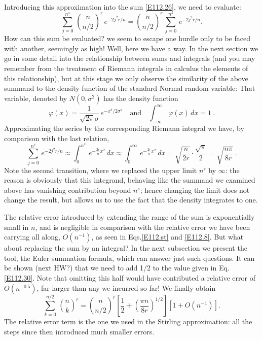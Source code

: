 \documentclass[11pt]{article}
\newcommand{\lp}{\left(}
\newcommand{\rp}{\right)}
\begin{document}
Introducing this approximation into the sum \eqref{E112.26}, we need to
evaluate:
\begin{equation}\label{E111.31}
\sum_{j=0}^{n^s} \,\binom{n}{n/2}^r \,e^{-2 j^2 r/n} =
\binom{n}{n/2}^r \,\sum_{j=0}^{n^s} \,e^{-2 j^2 r/n} . 
\end{equation}
How can this sum be evaluated?  we seem to escape one hurdle only to be
faced with another, seemingly as high!  Well, here we have a way.  In the
next section we go in some detail into the relationship between sums and
integrals (and you may remember from the treatment of Riemann integrals in
calculus the elements of this relationship), but at this stage we only
observe the similarity of the above summand to the density function of the
standard Normal random variable:
That variable, denoted by $N(0, \sigma^2 )$ 
has the density function
$$
\varphi (x) = \frac{1}{\sqrt{2\pi} \sigma} \,e^{-x^2 / 2 \sigma^2} \quad
\mbox{and} \quad \int_{-\infty}^\infty \,\varphi (x) \,dx =1 \ .
$$
Approximating the series by the corresponding Riemann integral we have, by
comparison with the last relation,
\begin{equation}\label{E112.30}
\sum_{j=0}^{n^s} \,e^{-2 j^2 r/n} \approx \int_0^{n^s} \,e^{-\frac{2r}{n}
x^2}\,dx \approx \int_0^\infty \,e^{-\frac{2r}{n} x^2}\,dx =
\sqrt{\frac{n}{2r}} \cdot \frac{\sqrt{\pi}}{2} = \sqrt{\frac{n\pi}{8r}} \ .
\end{equation}
Note the second transition, where we replaced the upper limit $n^s$ by
$\infty$:  the reason is obviously that this integrand, behaving like the
summand we examined above has vanishing contribution beyond $n^s$; hence
changing the limit does not change the result, but allows us to use the
fact that the density integrates to one.

The relative error introduced by extending the range of the sum
is exponentially small in $n$,
and is negligible in comparison with the relative error
we have been carrying all along, $O(n^{-1})$, as seen in
Eqs.\;\eqref{E112.st} and \eqref{E112.8}.  But what about replacing the sum
by an integral?  In the next subsection we present the tool, the
Euler summation formula, which can answer just such questions.
It can be shown (next HW?)
that we need to add 1/2 to the value given in Eq.\;\eqref{E112.30}.  Note
that omitting this half would have contributed a relative error of
$O(n^{-0.5})$, far larger than any we incurred so far!
We finally obtain
\begin{equation}\label{E112.32}
\sum_{k=0}^{n/2} \,\binom{n}{k}^r = \binom{n}{n/2}^r
\left[\frac1{2} + \lp \frac{\pi n}{8r} \rp^{1/2} \right]
\left[ 1 + O\lp n^{-1} \rp \right] . 
\end{equation}
The relative error term is the one we used in the Stirling approximation: all
the steps since then introduced much smaller errors.
\end{document}
